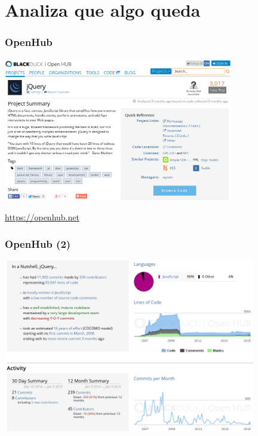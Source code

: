 %
%

\section{Analiza que algo queda}

\begin{frame}
\frametitle{OpenHub}

\begin{center}
\includegraphics[width=10cm]{figs/analisis-openhub}
\end{center}

\begin{flushright}
\url{https://openhub.net}
\end{flushright}

\end{frame}

\begin{frame}
\frametitle{OpenHub (2)}

\begin{center}
\includegraphics[width=11cm]{figs/analisis-openhub-2}
\end{center}

\end{frame}

